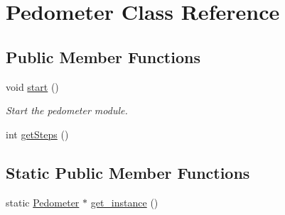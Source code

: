 \hypertarget{class_pedometer}{\section{Pedometer Class Reference}
\label{class_pedometer}
}
\subsection*{Public Member Functions}
\begin{DoxyCompactItemize}
\item 
void \hyperlink{class_pedometer_a6ba723efbe52177d23c41aa63d4f55d1}{start} ()
\begin{DoxyCompactList}\small\item\em Start the pedometer module. \end{DoxyCompactList}\item 
int \hyperlink{class_pedometer_a4d48e84820e8c2448d5147d1c7e2693a}{get\-Steps} ()
\end{DoxyCompactItemize}
\subsection*{Static Public Member Functions}
\begin{DoxyCompactItemize}
\item 
static \hyperlink{class_pedometer}{Pedometer} $\ast$ \hyperlink{class_pedometer_a55cca47bc6d703412bac2a20671a1785}{get\-\_\-instance} ()
\end{DoxyCompactItemize}


